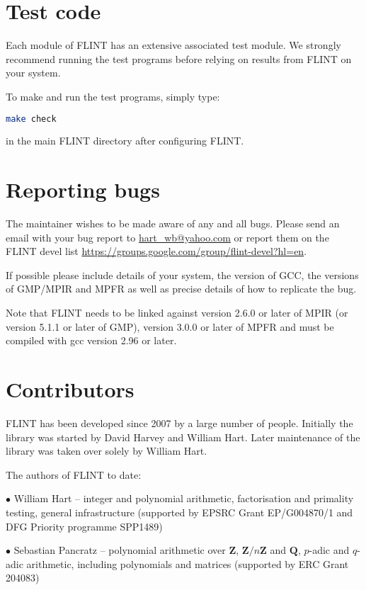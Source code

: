 \documentclass[a4paper,10pt]{book}
\newcommand{\Z}{\mathbf{Z}}%
\newcommand{\Q}{\mathbf{Q}}%
\begin{document}
\chapter{Test code}

Each module of FLINT has an extensive associated test module.  We
strongly recommend running the test programs before relying on results
from FLINT on your system.

To make and run the test programs, simply type:
\begin{lstlisting}[language=bash]
make check
\end{lstlisting}

in the main FLINT directory after configuring FLINT.

\chapter{Reporting bugs}

The maintainer wishes to be made aware of any and all bugs.  Please send an
email with your bug report to \url{hart_wb@yahoo.com} or report them on the
FLINT devel list \url{https://groups.google.com/group/flint-devel?hl=en}.

If possible please include details of your system, the version of GCC,
the versions of GMP/MPIR and MPFR as well as precise details of how to
replicate the bug.

Note that FLINT needs to be linked against version 2.6.0 or later of MPIR
(or version 5.1.1 or later of GMP), version 3.0.0 or later of MPFR and
must be compiled with gcc version 2.96 or later.

\chapter{Contributors}

FLINT has been developed since 2007 by a large number of people. Initially
the library was started by David Harvey and William Hart. Later maintenance
of the library was taken over solely by William Hart.

The authors of FLINT to date:

$\bullet$ William Hart -- integer and polynomial arithmetic, factorisation and
primality testing, general infrastructure (supported by EPSRC Grant
EP/G004870/1 and DFG Priority programme SPP1489)

$\bullet$ Sebastian Pancratz -- polynomial arithmetic over $\Z$, $\Z/n\Z$ and
$\Q$, $p$-adic and $q$-adic arithmetic, including polynomials and matrices
(supported by ERC Grant 204083)
\end{document}
